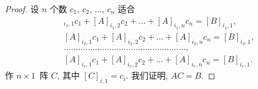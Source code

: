 \begin{proof}
    设 \(n\) 个数
    \(c_1\), \(c_2\), \(\dots\), \(c_n\)
    适合
    \begin{align*}
        [A]_{i_1,1} c_1 + [A]_{i_1,2} c_2 + \dots
        + [A]_{i_1,n} c_n = [B]_{i_1,1},
        \\
        [A]_{i_2,1} c_1 + [A]_{i_2,2} c_2 + \dots
        + [A]_{i_2,n} c_n = [B]_{i_2,1},
        \\
        \dots
        \dots \dots \dots \dots
        \dots \dots \dots \dots
        \dots \dots \dots \dots
        \dots \dots \dots \dots,
        \\
        [A]_{i_r,1} c_1 + [A]_{i_r,2} c_2 + \dots
        + [A]_{i_r,n} c_n = [B]_{i_r,1}.
    \end{align*}
    作 \(n \times 1\)~阵 \(C\),
    其中 \([C]_{i,1} = c_i\).
    我们证明, \(AC = B\).


\end{proof}
